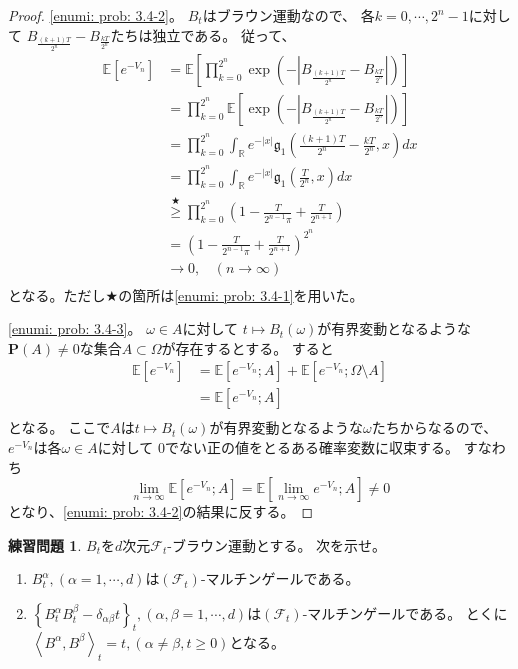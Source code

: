 \documentclass[uplatex]{jsarticle}
\theoremstyle{definition}
\newtheorem{prob}[prob]{練習問題}
\def\R{\mathbb{R}}
\def\P{\mathbf{P}}
\def\E{\mathbb{E}}
\def\mcF{\mathcal{F}}
\begin{document}
\begin{proof}
  \ref{enumi: prob: 3.4-2}。
  \(B_t\)はブラウン運動なので、
  各\(k=0,\cdots,2^n-1\)に対して
  \(B_{\frac{(k+1)T}{2^n}}-B_{\frac{kT}{2^n}}\)たちは独立である。
  従って、
  \begin{align*}
    \E\left[e^{-V_n}\right]
    &= \E\left[ \prod_{k=0}^{2^n}\exp
    \left(-|B_{\frac{(k+1)T}{2^n}}-B_{\frac{kT}{2^n}}|\right)\right] \\
    &= \prod_{k=0}^{2^n} \E\left[ \exp
    \left(-|B_{\frac{(k+1)T}{2^n}}-B_{\frac{kT}{2^n}}|\right)\right] \\
    &= \prod_{k=0}^{2^n} \int_{\R}e^{-|x|}
    \mathfrak{g}_1(\frac{(k+1)T}{2^n}-\frac{kT}{2^n},x)dx \\
    &= \prod_{k=0}^{2^n} \int_{\R}e^{-|x|}
    \mathfrak{g}_1(\frac{T}{2^n},x)dx \\
    &\overset{\bigstar}{\geq} \prod_{k=0}^{2^n}
    \left( 1-\frac{T}{2^{n-1}\pi}+\frac{T}{2^{n+1}}\right) \\
    &= \left( 1-\frac{T}{2^{n-1}\pi}+\frac{T}{2^{n+1}}\right)^{2^n} \\
    &\to 0, \ \ \ \ (n\to \infty) \\
  \end{align*}
  となる。ただし\(\bigstar\)の箇所は\ref{enumi: prob: 3.4-1}を用いた。

  \ref{enumi: prob: 3.4-3}。
  \(\omega \in A\)に対して
  \(t\mapsto B_t(\omega)\)が有界変動となるような
  \(\P(A) \neq 0\)な集合\(A\subset \Omega\)が存在するとする。
  すると
  \begin{align*}
    \E\left[ e^{-V_n}\right]
    &= \E\left[ e^{-V_n};A\right]
    + \E\left[ e^{-V_n}; \Omega \setminus A\right] \\
    &= \E\left[ e^{-V_n};A\right] \\
  \end{align*}
  となる。
  ここで\(A\)は\(t\mapsto B_t(\omega)\)が有界変動となるような\(\omega\)たちからなるので、
  \(e^{-V_n}\)は各\(\omega\in A\)に対して
  \(0\)でない正の値をとるある確率変数に収束する。
  すなわち
  \[
  \lim _{n\to \infty} \E\left[ e^{-V_n};A\right]
  = \E\left[ \lim_{n\to \infty} e^{-V_n};A \right] \neq 0
  \]
  となり、\ref{enumi: prob: 3.4-2}の結果に反する。
\end{proof}



\begin{prob}\label{prob: 3.5}
  \(B_t\)を\(d\)次元\(\mcF_t\)-ブラウン運動とする。
  次を示せ。
  \begin{enumerate}
    \item \label{enumi: prob: 3.5-1}
    \(B_t^{\alpha},(\alpha = 1,\cdots,d)\)は\((\mcF_t)\)-マルチンゲールである。
    \item \label{enumi: prob: 3.5-2}
    \(\left\{ B_t^{\alpha}B_t^{\beta} - \delta_{\alpha\beta}t\right\}_t,
    (\alpha,\beta = 1,\cdots ,d)\)は\((\mcF_t)\)-マルチンゲールである。
    とくに\(\left< B^{\alpha},B^{\beta}\right>_t = t ,
    (\alpha\neq \beta, t\geq 0)\)となる。
  \end{enumerate}
\end{prob}
\end{document}
